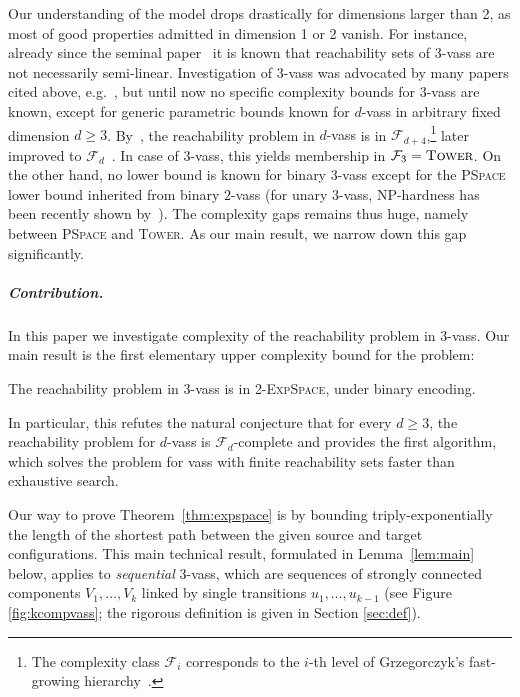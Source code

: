 \documentclass[a4paper, UKenglish, cleveref, autoref, thm-restate]{lipics-v2021}
\newcommand{\F}{\mathcal{F}}
\newcommand{\np}{\textsc{NP}\xspace}
\newcommand{\pspace}{\textsc{PSpace}\xspace}
\newcommand{\twoexpspace}{\textsc{2-ExpSpace}\xspace}
\newcommand{\tower}{\textsc{Tower}\xspace}
\newcommand{\vass}{{\sc vass}\xspace}
\newcommand{\dvass}{\parvass 2}
\newcommand{\tvass}{\parvass 3}
\newcommand{\parvass}[1]{{$#1$-\vass}\xspace}
\newcommand{\para}[1]{\vspace{-3mm}\subparagraph*{\bf #1.}}
\begin{document}
Our understanding of the model drops drastically for dimensions larger than 2,
as most of good properties admitted in dimension 1 or 2 vanish.
For instance, already since the seminal paper~\cite{DBLP:journals/tcs/HopcroftP79} it is known that
reachability sets of \tvass are not necessarily semi-linear.
Investigation of \tvass was advocated by many papers cited above, 
e.g.~\cite{DBLP:journals/tcs/HopcroftP79,BlondinFGHM15,DBLP:journals/jacm/BlondinEFGHLMT21},
but until now no specific complexity bounds for \tvass are known, except for generic 
parametric bounds known for \parvass d in arbitrary fixed dimension $d\geq 3$.
By~\cite{LS19}, the reachability problem in \parvass d
is in  $\F_{d+4}$,\footnote{The complexity class $\F_i$ corresponds to the $i$-th level 
of Grzegorczyk's fast-growing hierarchy~\cite{DBLP:journals/toct/Schmitz16}.}
later improved to $\F_d$~\cite{DBLP:conf/icalp/FuYZ24}.
In case of \tvass, this yields membership in $\F_3 = \tower$.
On the other hand, no lower bound is known for binary \tvass except for the \pspace lower bound 
inherited from binary \dvass
(for unary \tvass, \np-hardness has been recently shown by~\cite{DBLP:conf/focs/0001CMOSW24}).
The complexity gaps remains thus huge, namely between \pspace and \tower.
As our main result, we narrow down this gap significantly.




\para{Contribution}

In this paper we investigate complexity of the reachability problem in \tvass.
Our main result is the first elementary upper complexity bound for the problem:

\begin{theorem}\label{thm:expspace}
The reachability problem in \tvass is in \twoexpspace, under binary encoding.
\end{theorem}

\noindent
In particular, this refutes the natural conjecture that for every $d \geq 3$, the reachability problem for 
\parvass d is $\F_d$-complete and provides the first algorithm, which solves the problem
for \vass with finite reachability sets faster than exhaustive search.



Our way to prove Theorem~\ref{thm:expspace} is by bounding triply-exponentially 
the length of the shortest path between the given source and target configurations.
This main technical result, formulated in Lemma~\ref{lem:main} below,
applies to \emph{sequential} \tvass, which are sequences of strongly connected components
$V_1, \ldots, V_k$ linked by single transitions $u_1, \ldots, u_{k-1}$ 
(see Figure \ref{fig:kcompvass}; the rigorous definition is given in Section \ref{sec:def}).
\end{document}
